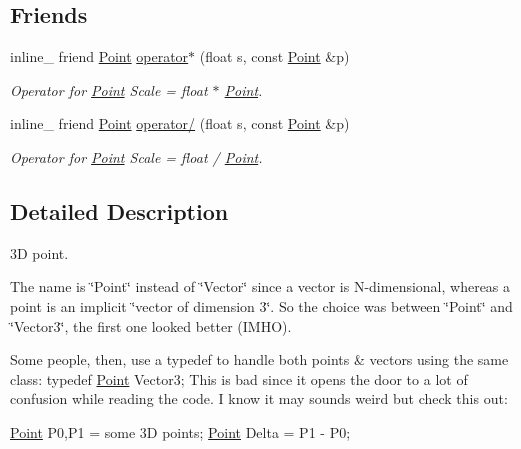\subsection*{Friends}
\begin{DoxyCompactItemize}
\item 
inline\+\_\+ friend \hyperlink{classPoint}{Point} \hyperlink{classPoint_a9ff6f894ad3fd6ffe459481cef490d8f}{operator$\ast$} (float s, const \hyperlink{classPoint}{Point} \&p)\hypertarget{classPoint_a9ff6f894ad3fd6ffe459481cef490d8f}{}\label{classPoint_a9ff6f894ad3fd6ffe459481cef490d8f}

\begin{DoxyCompactList}\small\item\em Operator for \hyperlink{classPoint}{Point} Scale = float $\ast$ \hyperlink{classPoint}{Point}. \end{DoxyCompactList}\item 
inline\+\_\+ friend \hyperlink{classPoint}{Point} \hyperlink{classPoint_a701c7cd1827352be21328ffe9021fec3}{operator/} (float s, const \hyperlink{classPoint}{Point} \&p)\hypertarget{classPoint_a701c7cd1827352be21328ffe9021fec3}{}\label{classPoint_a701c7cd1827352be21328ffe9021fec3}

\begin{DoxyCompactList}\small\item\em Operator for \hyperlink{classPoint}{Point} Scale = float / \hyperlink{classPoint}{Point}. \end{DoxyCompactList}\end{DoxyCompactItemize}


\subsection{Detailed Description}
3D point.

The name is \char`\"{}\+Point\char`\"{} instead of \char`\"{}\+Vector\char`\"{} since a vector is N-\/dimensional, whereas a point is an implicit \char`\"{}vector of dimension 3\char`\"{}. So the choice was between \char`\"{}\+Point\char`\"{} and \char`\"{}\+Vector3\char`\"{}, the first one looked better (I\+M\+HO).

Some people, then, use a typedef to handle both points \& vectors using the same class\+: typedef \hyperlink{classPoint}{Point} Vector3; This is bad since it opens the door to a lot of confusion while reading the code. I know it may sounds weird but check this out\+:


\begin{DoxyCode}
\hyperlink{classPoint}{Point} P0,P1 = some 3D points;
\hyperlink{classPoint}{Point} Delta = P1 - P0;
\end{DoxyCode}


